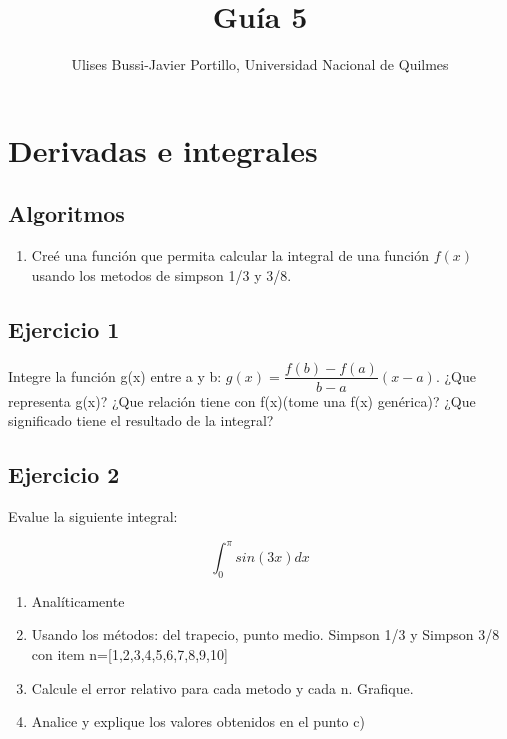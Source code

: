 \documentclass[a4paper,11pt]{article}
\makeatletter
\theoremstyle{mytheor}
\renewcommand{\maketitle}{
\colorbox{gray!20}{\framebox[\linewidth]{ \huge \textsc{\@title} } 
\lfoot{\@title}
}

}
\makeatother
\begin{document}
\title{Guía 5}

\author{Ulises Bussi-Javier Portillo, Universidad Nacional de Quilmes}


\maketitle \vspace{20pt}

\section*{Derivadas e integrales}
%

\subsection*{Algoritmos}

\begin{enumerate}[label=\Roman*]

\item Creé una función que permita calcular la integral de una función $f(x)$ usando los metodos de simpson 1/3 y 3/8.


\end{enumerate}

\subsection*{Ejercicio 1} Integre la función g(x) entre a y b: $g(x)=\dfrac{f(b)-f(a)}{b-a}(x-a)$. ¿Que representa g(x)? ¿Que relación tiene con f(x)(tome una f(x) genérica)? ¿Que significado tiene el resultado de la integral?

\subsection*{Ejercicio 2} 

Evalue la siguiente integral:

\begin{equation*}
    \int_{0}^{\pi}sin(3x)dx
\end{equation*}

\begin{enumerate}[label=\alph*)]
    \item Analíticamente
    \item Usando los métodos: del trapecio, punto medio. Simpson 1/3 y Simpson 3/8 con item n=[1,2,3,4,5,6,7,8,9,10]
    \item Calcule el error relativo para cada metodo y cada n. Grafique.
    \item Analice y explique los valores obtenidos en el punto c)
\end{enumerate} 
\end{document}
